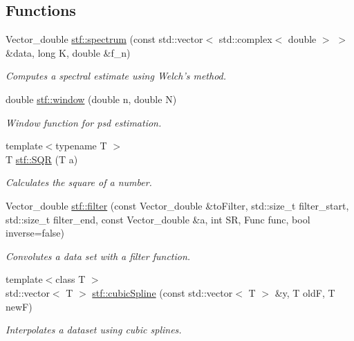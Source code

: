 \subsection*{Functions}
\begin{DoxyCompactItemize}
\item 
Vector\_\-double \hyperlink{group__stfgen_ga2fcd50c88877838de7ed4b52e1fedb59}{stf::spectrum} (const std::vector$<$ std::complex$<$ double $>$ $>$ \&data, long K, double \&f\_\-n)
\begin{DoxyCompactList}\small\item\em Computes a spectral estimate using Welch's method. \item\end{DoxyCompactList}\item 
double \hyperlink{group__stfgen_gacdf87f88e8ac06ad60a3f3b206b0cd91}{stf::window} (double n, double N)
\begin{DoxyCompactList}\small\item\em Window function for psd estimation. \item\end{DoxyCompactList}\item 
{\footnotesize template$<$typename T $>$ }\\T \hyperlink{group__stfgen_ga62f78deb330cc40d8ae6da48cdbec951}{stf::SQR} (T a)
\begin{DoxyCompactList}\small\item\em Calculates the square of a number. \item\end{DoxyCompactList}\item 
Vector\_\-double \hyperlink{group__stfgen_ga8d4bf7a86a487551837817a7d6d09cf1}{stf::filter} (const Vector\_\-double \&toFilter, std::size\_\-t filter\_\-start, std::size\_\-t filter\_\-end, const Vector\_\-double \&a, int SR, Func func, bool inverse=false)
\begin{DoxyCompactList}\small\item\em Convolutes a data set with a filter function. \item\end{DoxyCompactList}\item 
{\footnotesize template$<$class T $>$ }\\std::vector$<$ T $>$ \hyperlink{group__stfgen_gad6d6bf4577ec605215a4a374a3505a03}{stf::cubicSpline} (const std::vector$<$ T $>$ \&y, T oldF, T newF)
\begin{DoxyCompactList}\small\item\em Interpolates a dataset using cubic splines. \item\end{DoxyCompactList}\item 

\end{DoxyCompactItemize}
